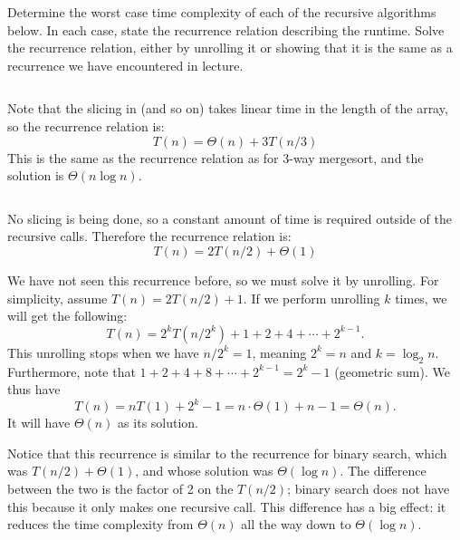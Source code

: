 \begin{prob}
    Determine the worst case time complexity of each of the recursive algorithms below.
    In each case, state the recurrence relation describing the runtime. Solve the recurrence
    relation, either by unrolling it or showing that it is the same as a recurrence we have
    encountered in lecture.

    \begin{subprobset}
        \begin{subprob}
            \inputminted{python}{\thisdir/include/part_a.py}

            \begin{soln}
                Note that the slicing in  (and so on) takes linear time
                in the length of the array, so the recurrence relation is:
                \[
                    T(n) = \Theta(n) + 3 T(n/3)
                \]
                This is the same as the  recurrence relation as for 3-way mergesort, and the solution
                is $\Theta(n \log n)$.
            \end{soln}
        \end{subprob}


        \begin{subprob}

            \inputminted{python}{\thisdir/include/part_b.py}

            \begin{soln}
                No slicing is being done, so a constant amount of time is required outside
                of the recursive calls. Therefore the recurrence relation is:
                \[
                    T(n) = 2T(n/2) + \Theta(1)
                \]

                We have not seen this recurrence before, so we must solve it by unrolling. 
                For simplicity, assume $T(n)= 2T(n/2) + 1$. 
                If we perform unrolling $k$ times, we will get the following: 
                \[ T(n) = 2^k T(n/2^k) + 1 + 2 + 4 + \cdots + 2^{k-1}.
                \] 
                This unrolling stops when we have $n / 2^k = 1$, meaning $2^k = n$ and $k = \log_2 n$. 
                Furthermore, note that $1 + 2 + 4 + 8 + \cdots + 2^{k-1} = 2^k - 1$ (geometric sum). 
                We thus have 
                \[ T(n) = n T(1) + 2^k  - 1 = n \cdot \Theta(1) + n - 1 = \Theta(n). \] 
                It will have $\Theta(n)$ as its solution.

                Notice that this recurrence is similar to the recurrence for
                binary search, which was $T(n/2) + \Theta(1)$, and whose solution was
                $\Theta(\log n)$. The difference between the two is the factor
                of 2 on the $T(n/2)$; binary search does not have this because it only
                makes one recursive call. This difference has a big effect: it reduces
                the time complexity from $\Theta(n)$ all the way down to $\Theta(\log n)$.


\end{soln}
\end{subprob}
\end{subprobset}
\end{prob}
